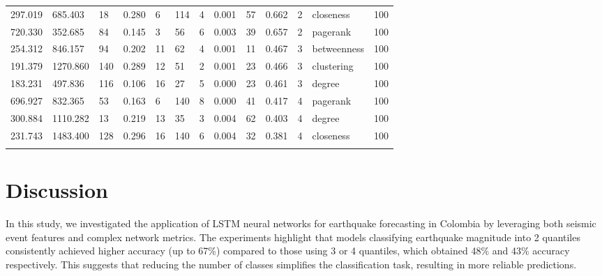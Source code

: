 \documentclass[sn-mathphys-num]{sn-jnl}
\begin{document}
\begin{table}
\begin{tabularx}{\textwidth}{@{}XXXXXXXXXXXll@{}}
        297.019  & 685.403   & 18       & 0.280     & 6          & 114         & 4           & 0.001 & 57         & 0.662    & 2         & closeness        & 100       \\
        720.330  & 352.685   & 84       & 0.145     & 3          & 56          & 6           & 0.003 & 39         & 0.657    & 2         & pagerank         & 100       \\
        \midrule
        254.312  & 846.157   & 94       & 0.202     & 11         & 62          & 4           & 0.001 & 11         & 0.467    & 3         & betweenness      & 100       \\
        191.379  & 1270.860  & 140      & 0.289     & 12         & 51          & 2           & 0.001 & 23         & 0.466    & 3         & clustering       & 100       \\
        183.231  & 497.836   & 116      & 0.106     & 16         & 27          & 5           & 0.000 & 23         & 0.461    & 3         & degree           & 100       \\
        \midrule
        696.927  & 832.365   & 53       & 0.163     & 6          & 140         & 8           & 0.000 & 41         & 0.417    & 4         & pagerank         & 100       \\
        300.884  & 1110.282  & 13       & 0.219     & 13         & 35          & 3           & 0.004 & 62         & 0.403    & 4         & degree           & 100       \\
        231.743  & 1483.400  & 128      & 0.296     & 16         & 140         & 6           & 0.004 & 32         & 0.381    & 4         & closeness        & 100       \\
        \botrule
    \end{tabularx}
\end{table}
\unskip

\section{Discussion}\label{discussion}

In this study, we investigated the application of LSTM neural networks for earthquake forecasting in Colombia by leveraging both seismic event features and complex network metrics. The experiments highlight that models classifying earthquake magnitude into 2 quantiles consistently achieved higher accuracy (up to 67\%) compared to those using 3 or 4 quantiles, which obtained 48\% and 43\% accuracy respectively. This suggests that reducing the number of classes simplifies the classification task, resulting in more reliable predictions.
\end{document}
